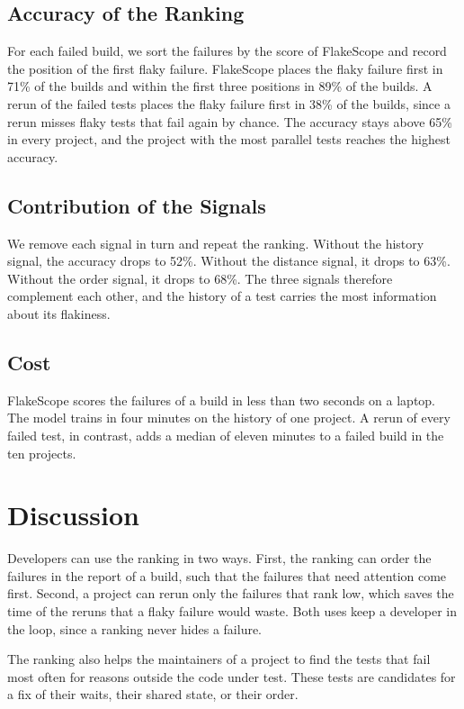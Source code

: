 \subsection{Accuracy of the Ranking}
For each failed build, we sort the failures by the score of FlakeScope and record the position of the first
flaky failure. FlakeScope places the flaky failure first in 71\% of the builds and within the first three
positions in 89\% of the builds. A rerun of the failed tests places the flaky failure first in 38\% of the
builds, since a rerun misses flaky tests that fail again by chance. The accuracy stays above 65\% in every
project, and the project with the most parallel tests reaches the highest accuracy.

\subsection{Contribution of the Signals}
We remove each signal in turn and repeat the ranking. Without the history signal, the accuracy drops to 52\%.
Without the distance signal, it drops to 63\%. Without the order signal, it drops to 68\%. The three signals
therefore complement each other, and the history of a test carries the most information about its flakiness.

\subsection{Cost}
FlakeScope scores the failures of a build in less than two seconds on a laptop. The model trains in four minutes
on the history of one project. A rerun of every failed test, in contrast, adds a median of eleven minutes to a
failed build in the ten projects.

\section{Discussion}
Developers can use the ranking in two ways. First, the ranking can order the failures in the report of a build,
such that the failures that need attention come first. Second, a project can rerun only the failures that rank
low, which saves the time of the reruns that a flaky failure would waste. Both uses keep a developer in the loop,
since a ranking never hides a failure.

The ranking also helps the maintainers of a project to find the tests that fail most often for reasons outside
the code under test. These tests are candidates for a fix of their waits, their shared state, or their order.


